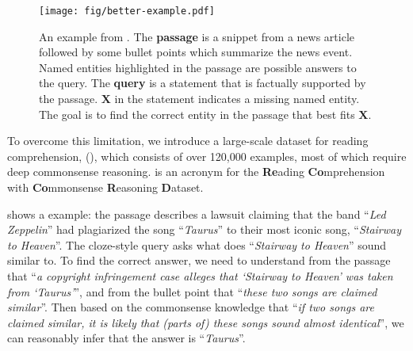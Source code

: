 
\begin{figure}[!t]
\centering
\texttt{[image: fig/better-example.pdf]}
\caption{An example from \ReCoRD. 
The \textbf{passage} is a snippet from a news article followed by some bullet points which summarize the news event. Named entities highlighted in the passage are possible answers to the query.
The \textbf{query} is a statement that is factually supported by the passage.
    $\mathbf{X}$ in the statement indicates a missing named entity.
    The goal is to find the correct entity in the passage that best fits $\mathbf{X}$.\label{fig:example}}
\end{figure}

To overcome this limitation, we introduce a large-scale dataset for reading comprehension, \ReCoRD (\textipa{["rEk@rd]}), which consists of over 120,000 examples, most of which require deep commonsense reasoning.
\ReCoRD is an acronym for the \textbf{Re}ading \textbf{Co}mprehension with \textbf{Co}mmonsense \textbf{R}easoning \textbf{D}ataset. 

 shows a \ReCoRD example: 
the passage describes a lawsuit claiming that the band  ``\emph{Led Zeppelin}'' had plagiarized the song ``\emph{Taurus}'' to their most iconic song, ``\emph{Stairway to Heaven}''.
The cloze-style query asks what does ``\emph{Stairway to Heaven}'' sound similar to. 
To find the correct answer, we need to understand from the passage that ``\emph{a copyright infringement case alleges that `Stairway to Heaven' was taken from `Taurus'}'', and from the bullet point that ``\emph{these two songs are claimed similar}''. 
Then based on the commonsense knowledge that ``\emph{if two songs are claimed similar, it is likely that (parts of) these songs sound almost identical}'', we can reasonably infer that the answer is ``\emph{Taurus}''.

